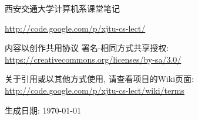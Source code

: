 \clearpage

\sf \Large

西安交通大学计算机系课堂笔记

\url{http://code.google.com/p/xjtu-cs-lect/}

\vskip 1cm


内容以创作共用协议 署名-相同方式共享授权: \\
\indent\url{https://creativecommons.org/licenses/by-sa/3.0/}

\vskip 1cm

关于引用或以其他方式使用, 请查看项目的Wiki页面: \\
\indent\url{http://code.google.com/p/xjtu-cs-lect/wiki/terms}

\vskip 14cm

\hfill 生成日期: \today

\rm \normalsize
\thispagestyle{empty}
\setcounter{page}{0}
\clearpage
